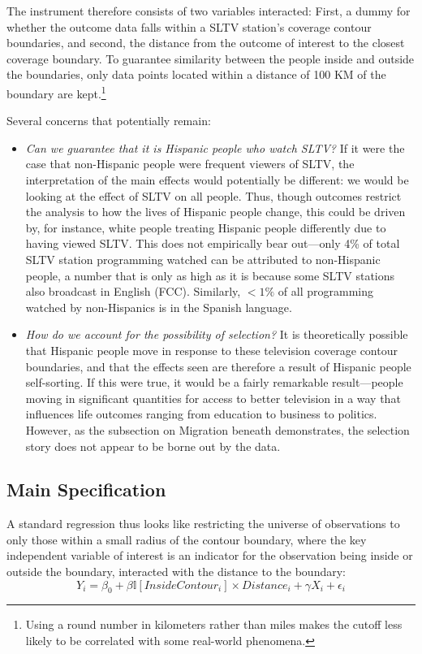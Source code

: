 \documentclass[11pt]{article}
\begin{document}
The instrument therefore consists of two variables interacted: First, a dummy for whether the outcome data falls within a SLTV station's coverage contour boundaries, and second, the distance from the outcome of interest to the closest coverage boundary. To guarantee similarity between the people inside and outside the boundaries, only data points located within a distance of 100 KM of the boundary are kept.\footnote{ Using a round number in kilometers rather than miles makes the cutoff less likely to be correlated with some real-world phenomena.} 

Several concerns that potentially remain:
\begin{itemize}
\item \textit{Can we guarantee that it is Hispanic people who watch SLTV?} If it were the case that non-Hispanic people were frequent viewers of SLTV, the interpretation of the main effects would potentially be different: we would be looking at the effect of SLTV on all people. Thus, though outcomes restrict the analysis to how the lives of Hispanic people change, this could be driven by, for instance, white people treating Hispanic people differently due to having viewed SLTV. This does not empirically bear out---only 4\% of total SLTV station programming watched can be attributed to non-Hispanic people, a number that is only as high as it is because some SLTV stations also broadcast in English  (FCC\cite{noauthor_hispanic_2016}). Similarly, $<1\%$ of all programming watched by non-Hispanics is in the Spanish language.

\item \textit{How do we account for the possibility of selection?} It is theoretically possible that Hispanic people move in response to these television coverage contour boundaries, and that the effects seen are therefore a result of Hispanic people self-sorting. If this were true, it would be a fairly remarkable result---people moving in significant quantities for access to better television in a way that influences life outcomes ranging from education to business to politics. However, as the subsection on Migration beneath demonstrates, the selection story does not appear to be borne out by the data.
\end{itemize}

\subsection{Main Specification}

A standard regression thus looks like restricting the universe of observations to only those within a small radius of the contour boundary, where the key independent variable of interest is an indicator for the observation being inside or outside the boundary, interacted with the distance to the boundary:
\[ Y_i^{} = \beta_0 + \beta \mathbb{I}[InsideContour_i] \times Distance_i + \gamma X_i + \epsilon_i \]
\end{document}
